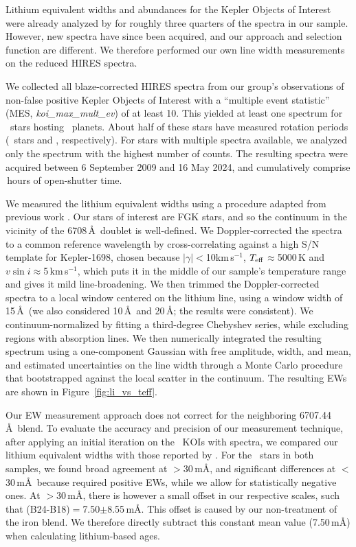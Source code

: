 \documentclass[11pt,twocolumn,tighten]{aastex63}
\newcommand{\kms}{{km\,s$^{-1}$}}
\begin{document}
Lithium equivalent widths and abundances for the Kepler Objects of
Interest were already analyzed by \citet{2018ApJ...855..115B} for
roughly three quarters of the spectra in our sample.  However, new
spectra have since been acquired, and our approach and selection
function are different.  We therefore performed our own line width
measurements on
the reduced HIRES spectra.

We collected all blaze-corrected HIRES spectra from our group's
observations of non-false positive Kepler Objects of Interest with a
``multiple event statistic'' (MES, {\it koi\_max\_mult\_ev}) of at
least 10.  This yielded at least one spectrum for \nstwithspec\
stars hosting \nplwithspec\ planets.  About half of these stars have
measured rotation periods (\nstwithspecandprot\ stars and
\nplwithspecandprot, respectively).   For stars with multiple spectra
available, we analyzed only
the spectrum with the highest number of counts.  The resulting spectra
were acquired between 6 September 2009 and 16 May 2024, and
cumulatively comprise \nhireshours\,hours of open-shutter time.

We measured the lithium equivalent widths using a procedure adapted
from previous work \citep{Bouma_2021}.  Our stars of interest are FGK
stars, and so the continuum in the vicinity of the \ion{Li}{1}
6708\,\AA\ doublet is well-defined.  We Doppler-corrected the spectra
to a common reference wavelength by cross-correlating against a high
S/N template for Kepler-1698, chosen because $|\gamma|$$<$10\kms,
$T_{\rm eff}$$\approx$5000\,K and $v\sin i$$\approx$5\,\kms, which
puts it in the middle of our sample's temperature range and gives it
mild line-broadening.  We then trimmed the Doppler-corrected spectra
to a local window centered on the lithium line, using a window width
of 15\,\AA\ (we also considered 10\,\AA\ and 20\,\AA; the results were
consistent).  We continuum-normalized by fitting a third-degree
Chebyshev series, while excluding regions with absorption lines.  We
then numerically integrated the resulting spectrum using a
one-component Gaussian with free amplitude, width, and mean, and
estimated uncertainties on the line width through a Monte Carlo
procedure that bootstrapped against the local scatter in the continuum.
The resulting EWs are shown in Figure~\ref{fig:li_vs_teff}.

Our EW measurement approach does not correct for the neighboring
\ion{Fe}{1} 6707.44\,\AA\ blend.  To evaluate the accuracy and
precision of our measurement technique, after applying an initial
iteration on the \nlithiumstars\ KOIs with spectra, we compared our
lithium equivalent widths with those reported by
\citet{2018ApJ...855..115B}.  For the \nbergeroverlap\ stars in both
samples, we found broad agreement at $>$30\,m\AA, and significant
differences at $<$30\,m\AA\ because \citet{2018ApJ...855..115B}
required positive EWs, while we allow for statistically negative ones.  At
$>$30\,m\AA, there is however a small offset in our respective scales,
such that (B24-B18)$=$7.50$\pm$8.55\,m\AA.  This offset is caused by
our non-treatment of the iron blend.  We therefore directly subtract
this constant mean value (7.50\,m\AA) when calculating lithium-based
ages.
\end{document}
